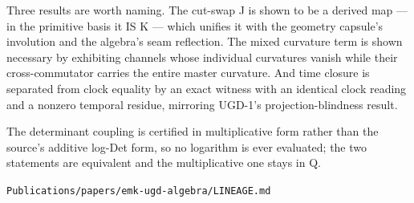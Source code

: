 Three results are worth naming. The cut-swap J is shown to be a derived
map --- in the primitive basis it IS K --- which unifies it with the
geometry capsule's involution and the algebra's seam reflection. The
mixed curvature term is shown necessary by exhibiting channels whose
individual curvatures vanish while their cross-commutator carries the
entire master curvature. And time closure is separated from clock
equality by an exact witness with an identical clock reading and a
nonzero temporal residue, mirroring UGD-1's projection-blindness result.

The determinant coupling is certified in multiplicative form rather than
the source's additive log-Det form, so no logarithm is ever evaluated;
the two statements are equivalent and the multiplicative one stays in Q.

\begin{flushright}\small\texttt{Publications/papers/emk-ugd-algebra/LINEAGE.md}\end{flushright}
